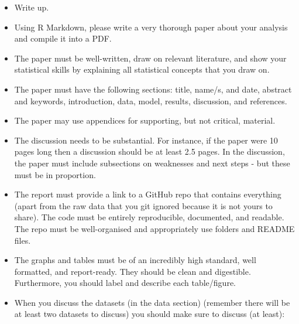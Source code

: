\documentclass[
]{book}
\providecommand{\tightlist}{%
  \setlength{\itemsep}{0pt}\setlength{\parskip}{0pt}}
\begin{document}
\begin{itemize}
  \begin{itemize}
  \tightlist
  \item
    Write up.
  \item
    Using R Markdown, please write a very thorough paper about your analysis and compile it into a PDF.
  \item
    The paper must be well-written, draw on relevant literature, and show your statistical skills by explaining all statistical concepts that you draw on.
  \item
    The paper must have the following sections: title, name/s, and date, abstract and keywords, introduction, data, model, results, discussion, and references.
  \item
    The paper may use appendices for supporting, but not critical, material.
  \item
    The discussion needs to be substantial. For instance, if the paper were 10 pages long then a discussion should be at least 2.5 pages. In the discussion, the paper must include subsections on weaknesses and next steps - but these must be in proportion.
  \item
    The report must provide a link to a GitHub repo that contains everything (apart from the raw data that you git ignored because it is not yours to share). The code must be entirely reproducible, documented, and readable. The repo must be well-organised and appropriately use folders and README files.
  \item
    The graphs and tables must be of an incredibly high standard, well formatted, and report-ready. They should be clean and digestible. Furthermore, you should label and describe each table/figure.
  \item
    When you discuss the datasets (in the data section) (remember there will be at least two datasets to discuss) you should make sure to discuss (at least):


\end{itemize}
\end{itemize}
\end{document}
